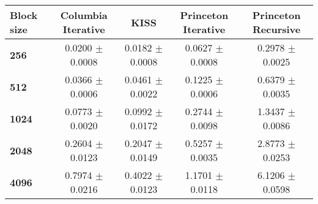 \begin{tabular}{lcccc}\toprule
\textbf{Block size}  & \textbf{Columbia Iterative} & \textbf{KISS} & \textbf{Princeton Iterative} & \textbf{Princeton Recursive}\\\midrule
\textbf{256}  & 0.0200 $\pm$ 0.0008 & 0.0182 $\pm$ 0.0008 & 0.0627 $\pm$ 0.0008 & 0.2978 $\pm$ 0.0025\\
\textbf{512}  & 0.0366 $\pm$ 0.0006 & 0.0461 $\pm$ 0.0022 & 0.1225 $\pm$ 0.0006 & 0.6379 $\pm$ 0.0035\\
\textbf{1024}  & 0.0773 $\pm$ 0.0020 & 0.0992 $\pm$ 0.0172 & 0.2744 $\pm$ 0.0098 & 1.3437 $\pm$ 0.0086\\
\textbf{2048}  & 0.2604 $\pm$ 0.0123 & 0.2047 $\pm$ 0.0149 & 0.5257 $\pm$ 0.0035 & 2.8773 $\pm$ 0.0253\\
\textbf{4096} & 0.7974 $\pm$ 0.0216 & 0.4022 $\pm$ 0.0123 & 1.1701 $\pm$ 0.0118 & 6.1206 $\pm$ 0.0598\\
\bottomrule
\end{tabular}
